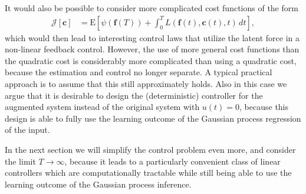 \documentclass[journal]{IEEEtran}
\begin{document}
It would also be possible to consider more complicated cost functions of the form
%
\begin{equation}
\begin{split}
  \mathcal{J}[\mathbf{c}] &= \mathrm{E} \left[ \psi(\mathbf{f}(T))
   + \int_0^T L(\mathbf{f}(t),\mathbf{c}(t),t) \, dt \right],
\end{split}
\end{equation}
%
which would then lead to interesting control laws that utilize the latent force in a
non-linear feedback control. However, the use of more general cost functions than the quadratic cost is considerably more complicated than using a quadratic cost, because the estimation and control no longer separate. A typical practical approach is to assume that this still approximately holds. Also in this case we argue that it is desirable to design the (deterministic) controller for the augmented system instead of the original system with $u(t) = 0$, because this design is able to fully use the learning outcome of the Gaussian process regression of the input.

In the next section we will simplify the control problem even more, and consider the limit $T \to \infty$, because it leads to a particularly convenient class of linear controllers which are computationally tractable while still being able to use the learning outcome of the Gaussian process inference.
\end{document}
